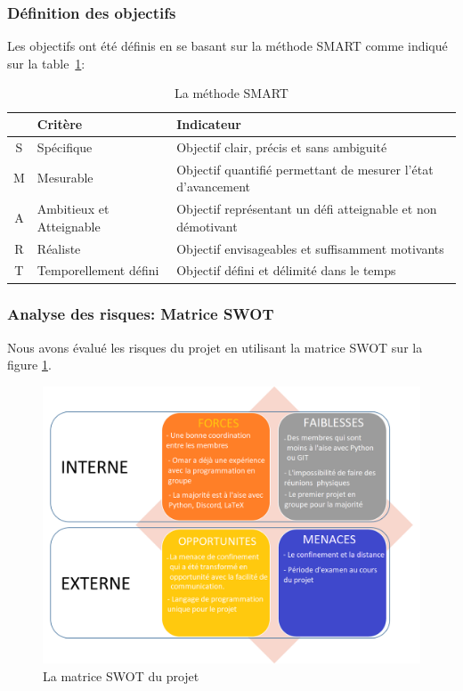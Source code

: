 \documentclass[12pt]{article}
\begin{document}
\subsubsection{Définition des objectifs}
Les objectifs ont été définis en se basant sur la méthode SMART comme indiqué sur la table~\ref{tab:SMART}: 
\begin{table} [!h]
 \begin{center}
 \begin{tabular}{|c||l|l|}
 \hline
  & Critère & Indicateur \\
 \hline
 S & Spécifique & Objectif clair, précis et sans ambiguité \\
 \hline
 M & Mesurable & Objectif quantifié permettant de mesurer l'état d'avancement \\
 \hline
 A & Ambitieux et Atteignable & Objectif représentant un défi atteignable et non démotivant \\
 \hline
 R & Réaliste & Objectif envisageables et suffisamment motivants \\
 \hline
 T & Temporellement défini  & Objectif défini et délimité dans le temps \\
 \hline
 \end{tabular}
 \end{center}
 \caption{La méthode SMART}
 \label{tab:SMART}
 \end{table}



\subsubsection{Analyse des risques: Matrice SWOT}
Nous avons évalué les risques du projet en utilisant la matrice SWOT sur la figure \ref{fig:Matrice SWOT}.
        \begin{figure}[!h]
             \centering
             \includegraphics[scale = 0.5]{Images/Gestion de Projet/Matrice_swot.png}
             \caption{La matrice SWOT du projet}
             \label{fig:Matrice SWOT}
        \end{figure}
\end{document}
